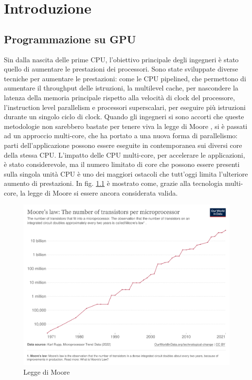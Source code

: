 \chapter{Introduzione}
\label{sec:intro}

\section[Programmazione su GPU]{Programmazione su GPU}

Sin dalla nascita delle prime \gls{CPU}, l'obiettivo principale degli ingegneri è stato quello di aumentare le prestazioni dei processori. Sono state sviluppate diverse tecniche per aumentare le prestazioni: come le \gls{CPU} pipelined, che permettono di aumentare il throughput delle istruzioni, la multilevel cache, per nascondere la latenza della memoria principale rispetto alla velocità di clock del processore, l'instruction level parallelism e processori superscalari, per eseguire più istruzioni durante un singolo ciclo di clock.
Quando gli ingegneri si sono accorti che queste metodologie non sarebbero bastate per tenere viva la legge di Moore \cite[]{Moore:law}, si è passati ad un approccio multi-core, che ha portato a una nuova forma di parallelismo: parti dell'applicazione possono essere eseguite in contemporanea sui diversi core della stessa \gls{CPU}. L'impatto delle \gls{CPU} multi-core, per accelerare le applicazioni, è stato considerevole, ma il numero limitato di core che possono essere presenti sulla singola unità \gls{CPU} è uno dei maggiori ostacoli che tutt'oggi limita l'ulteriore aumento di prestazioni. In fig. \ref{fig:moore_law} è mostrato come, grazie alla tecnologia multi-core, la legge di Moore si essere ancora considerata valida.

\begin{figure}[ht]
\centering
\includegraphics[width=.9\linewidth]{images/chapter1/moore_law.png}
\caption{Legge di Moore}
\label{fig:moore_law}
\end{figure}

